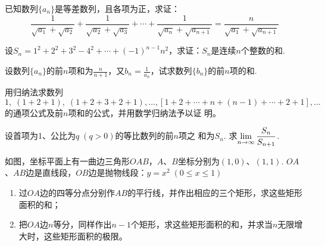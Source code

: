 \begin{enumerate}
\item 已知数列$\{a_n\}$是等差数列，且各项为正，求证：
\[\frac{1}{\sqrt{a_1}+\sqrt{a_2}}+\frac{1}{\sqrt{a_2}+\sqrt{a_3}}+\cdots+\frac{1}{\sqrt{a_n}+\sqrt{a_{n+1}}}=\frac{n}{\sqrt{a_1}+\sqrt{a_{n+1}}}\]

\item 设$S_n=1^2+2^2+3^2-4^2+\cdots +(-1)^{n-1}n^2$，求证：$S_n$是连续$n$个整数的和.
\item 设数列$\{a_n\}$的前$n$项和为$\frac{n}{n+1}$，又$b_n=\frac{1}{a_n}$，试求数列$\{b_n\}$的前$n$项的和.
\item 用归纳法求数列
\[1,\; (1+2+1),\; (1+2+3+2+1),\ldots, [1+2+\cdots+n+(n-1)+\cdots+2+1],\ldots\]
的通项公式及前$n$项和的公式，并用数学归纳法予以证
明。
\item 设首项为1、公比为$q\; (q>
0)$的等比数列的前$n$项之
和为$S_n$. 求$\lim\limits_{n\to \infty}\dfrac{S_n}{S_{n+1}}$.

\noindent
\begin{minipage}{.5\textwidth}
\item 如图，坐标平面上有一曲边三角形$OAB$，$A$、$B$坐标分别为$(1,0)$、$(1,1)$. 
$OA$、$AB$边是直线段，$OB$边是抛物线段：$y=x^2\; (0\le x \le 1)$
\begin{enumerate}[(1)]
    \item 过$OA$边的四等分点分别作$AB$的平行线，并作出相应的三个矩形，求这些矩形面积的和；
    \item 把$OA$边$n$等分，同样作出$n-1$个矩形，求这些矩形面积的和，并求当$n$无限增大时，这些矩形面积的极限。
\end{enumerate}    
\end{minipage}\hfill
\begin{minipage}{.45\textwidth}
     \centering
{}
\end{minipage}



\end{enumerate}